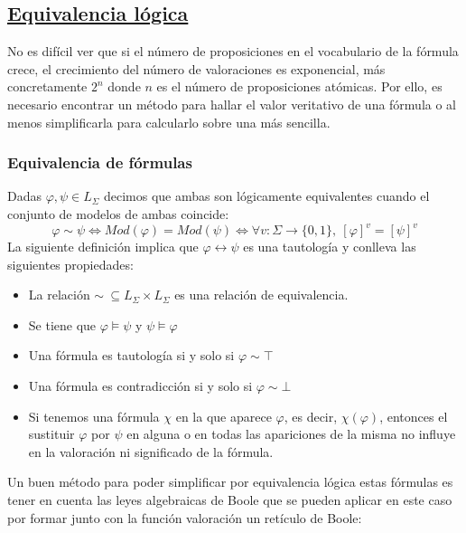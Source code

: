 \documentclass[10pt,a4paper,openright]{book}
\begin{document}
\subsection*{\underline{Equivalencia lógica}}
No es difícil ver que si el número de proposiciones en el vocabulario de la fórmula crece, el crecimiento del número de valoraciones es exponencial, más concretamente $2^n$ donde $n$ es el número de proposiciones atómicas. Por ello, es necesario encontrar un método para hallar el valor veritativo de una fórmula o al menos simplificarla para calcularlo sobre una más sencilla.

\subsubsection*{Equivalencia de fórmulas}
Dadas $\varphi, \psi\in L_\Sigma$ decimos que ambas son lógicamente equivalentes cuando el conjunto de modelos de ambas coincide:
$$\varphi \sim \psi \Leftrightarrow Mod(\varphi) = Mod(\psi) \Leftrightarrow \forall v: \Sigma \rightarrow \{0,1\}, \ [\varphi]^v = [\psi]^v$$
La siguiente definición implica que $\varphi \leftrightarrow \psi$ es una tautología y conlleva las siguientes propiedades:
\begin{itemize}
\item La relación $\sim \ \subseteq L_\Sigma \times L_\Sigma$ es una relación de equivalencia.
\item Se tiene que $\varphi\models \psi$ y $\psi \models\varphi$
\item Una fórmula es tautología si y solo si $\varphi \sim \top$
\item Una fórmula es contradicción si y solo si $\varphi \sim \bot$
\item Si tenemos una fórmula $\chi$ en la que aparece $\varphi$, es decir, $\chi(\varphi)$, entonces el sustituir $\varphi$ por $\psi$ en alguna o en todas las apariciones de la misma no influye en la valoración ni significado de la fórmula.
\end{itemize}
Un buen método para poder simplificar por equivalencia lógica estas fórmulas es tener en cuenta las leyes algebraicas de Boole que se pueden aplicar en este caso por formar junto con la función valoración un retículo de Boole:
\end{document}
